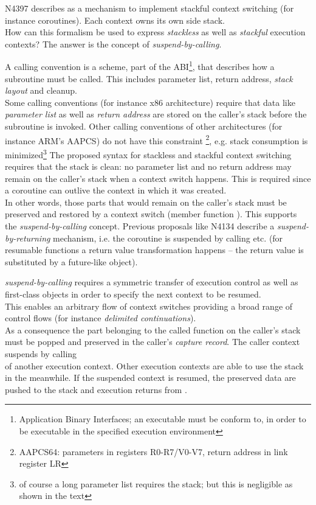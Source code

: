 \newpage
{}
N4397\cite{N4397} describes \ectx as a mechanism to implement stackful context
switching (for instance coroutines). Each context owns its own side stack.\\
How can this formalism be used to express \emph{stackless} as well as
\emph{stackful} execution contexts? The answer is the concept of
\emph{suspend-by-calling}.

A calling convention is a scheme, part of the ABI\footnote{Application Binary
Interfaces; an executable must be conform to, in order to be executable in the
specified execution environment}, that describes how a subroutine must be
called. This includes parameter list, return address, \emph{stack layout} and
cleanup.\\
Some calling conventions (for instance x86 architecture) require that data like
\emph{parameter list} as well as \emph{return address} are stored on the caller's
stack before the subroutine is invoked. Other calling conventions of other
architectures (for instance ARM's AAPCS) do not have this constraint
\footnote{AAPCS64: parameters in registers R0-R7/V0-V7, return address in link
register LR}, e.g. stack consumption is minimized\footnote{of course a long
parameter list requires the stack; but this is negligible as shown in the text}
\newline
The proposed syntax for stackless and stackful context switching requires that
the stack is clean: no parameter list and no return address may remain on the
caller's stack when a context switch happens. This is required since a
coroutine can outlive the context in which it was created.\\
In other words, those parts that would remain on the caller's stack must be
preserved and restored by a context switch (member function \ectxop). This
supports the \emph{suspend-by-calling} concept. Previous proposals like
N4134\cite{N4134} describe a \emph{suspend-by-returning} mechanism, i.e. the
coroutine is suspended by calling \yield etc. (for resumable functions a return
value transformation happens -- the return value is substituted by a future-like
object).

\emph{suspend-by-calling} requires a symmetric transfer of execution control
as well as first-class objects in order to specify the next context to be
resumed.\\
This enables an arbitrary flow of context switches providing a broad range of
control flows (for instance \emph{delimited continuations}).\\
As a consequence the part belonging to the called function on the caller's stack
must be popped and preserved in the caller's \emph{capture record}. The caller
context suspends by calling\\
\ectxop of another execution context. Other execution contexts are able to use
the stack in the meanwhile. If the suspended context is resumed, the preserved
data are pushed to the stack and execution returns from \ectxop.

